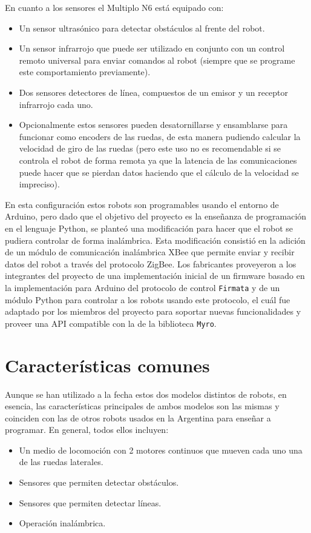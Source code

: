 En cuanto a los sensores el Multiplo N6 está equipado con:
\begin{itemize}
    \item Un sensor ultrasónico para detectar obstáculos al frente del
        robot.
    \item Un sensor infrarrojo que puede ser utilizado en conjunto con
        un control remoto universal para enviar comandos al robot
        (siempre que se programe este comportamiento previamente).
    \item Dos sensores detectores de línea, compuestos de un emisor y
        un receptor infrarrojo cada uno.
    \item Opcionalmente estos sensores pueden desatornillarse y ensamblarse
        para funcionar como encoders de las ruedas, de esta manera pudiendo
        calcular la velocidad de giro de las ruedas (pero este uso
        no es recomendable si se controla el robot de forma remota
        ya que la latencia de las comunicaciones puede hacer que se pierdan
        datos haciendo que el cálculo de la velocidad se impreciso).
\end{itemize}

En esta configuración estos robots son programables usando el entorno de
Arduino, pero dado que el objetivo del proyecto es la enseñanza de 
programación en el lenguaje Python,  se planteó una modificación
para hacer que el robot se pudiera controlar de forma inalámbrica. Esta
modificación consistió en la adición de un módulo de comunicación inalámbrica
XBee que permite enviar y recibir datos del robot a través del protocolo
ZigBee. Los fabricantes proveyeron a los integrantes del
proyecto \proyecto{} de una implementación
inicial de un firmware basado en la implementación para Arduino del protocolo
de control \texttt{Firmata} y
de un módulo Python para controlar a los robots usando este protocolo, el
cuál fue adaptado por los miembros del proyecto \proyecto{}
para soportar nuevas funcionalidades y proveer una
API compatible con la de la biblioteca \texttt{Myro}.

\section{Características comunes}
Aunque se han utilizado a la fecha estos dos modelos distintos de robots,
en esencia, las características principales de ambos modelos son las mismas
y coinciden con las de otros robots usados en la Argentina para enseñar a
programar. En general, todos ellos incluyen:
\begin{itemize}
    \item Un medio de locomoción  con 2 motores continuos que mueven cada
        uno una de las ruedas laterales.
    \item Sensores que permiten detectar obstáculos.
    \item Sensores que permiten detectar líneas.
    \item Operación inalámbrica.
\end{itemize}

